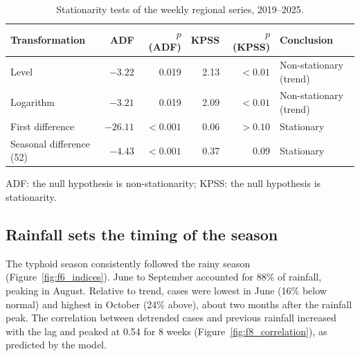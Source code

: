 \documentclass[11pt]{article}
\begin{document}
\begin{table}[!htbp]\centering\small
\caption{Stationarity tests of the weekly regional series, 2019–2025.}\label{tab:stat}
\begin{tabularx}{\linewidth}{@{}L rrrr L@{}}\toprule
Transformation & ADF & $p$ (ADF) & KPSS & $p$ (KPSS) & Conclusion \\\midrule
Level & $-3.22$ & 0.019 & 2.13 & $<0.01$ & Non-stationary (trend) \\
Logarithm & $-3.21$ & 0.019 & 2.09 & $<0.01$ & Non-stationary (trend) \\
First difference & $-26.11$ & $<0.001$ & 0.06 & $>0.10$ & Stationary \\
Seasonal difference (52) & $-4.43$ & $<0.001$ & 0.37 & 0.09 & Stationary \\\bottomrule
\end{tabularx}
\par\smallskip\footnotesize\raggedright ADF: the null hypothesis is non-stationarity; KPSS: the null hypothesis is stationarity.
\end{table}


\subsection{Rainfall sets the timing of the season}
The typhoid season consistently followed the rainy season (Figure~\ref{fig:f6_indices}). June to September accounted for 88\% of rainfall, peaking in August. Relative to trend, cases were lowest in June (16\% below normal) and highest in October (24\% above), about two months after the rainfall peak. The correlation between detrended cases and previous rainfall increased with the lag and peaked at 0.54 for 8 weeks (Figure~\ref{fig:f8_correlation}), as predicted by the model.


\end{document}
